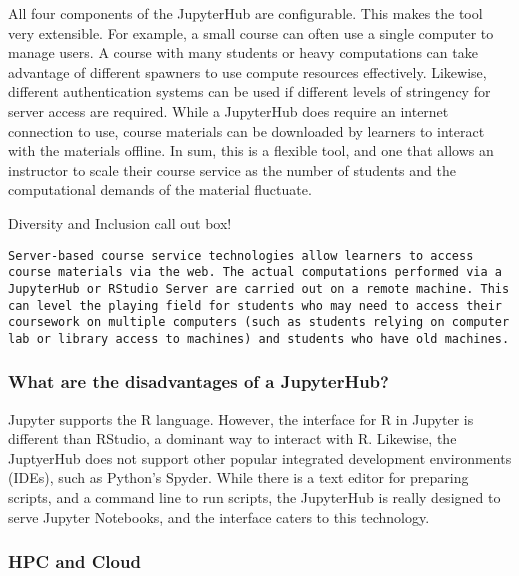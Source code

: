 All four components of the JupyterHub are configurable.
This makes the tool very extensible. 
For example, a small course can often use a single computer to manage users.
A course with many students or heavy computations can take advantage of different spawners to use compute resources effectively.
Likewise, different authentication systems can be used if different levels of stringency for server access are required.
While a JupyterHub does require an internet connection to use, course materials can be downloaded by learners to interact with the materials offline. 
In sum, this is a flexible tool, and one that allows an instructor to scale their course service as the number of students and the computational demands of the material fluctuate. 


{\begin{framed}
Diversity and Inclusion call out box! 
\begin{snugshade*}
\begin{lstlisting}
Server-based course service technologies allow learners to access course materials via the web. The actual computations performed via a JupyterHub or RStudio Server are carried out on a remote machine. This can level the playing field for students who may need to access their coursework on multiple computers (such as students relying on computer lab or library access to machines) and students who have old machines.
\end{lstlisting}
\end{snugshade*}
\end{framed}}

\subsubsection{What are the disadvantages of a JupyterHub?}

Jupyter supports the R language.
However, the interface for R in Jupyter is different than RStudio, a dominant way to interact with R.
Likewise, the JuptyerHub does not support other popular integrated development environments (IDEs), such as Python's Spyder.
While there is a text editor for preparing scripts, and a command line to run scripts, the JupyterHub is really designed to serve Jupyter Notebooks, and the interface caters to this technology.



\subsubsection{HPC and Cloud}\label{HPC}

